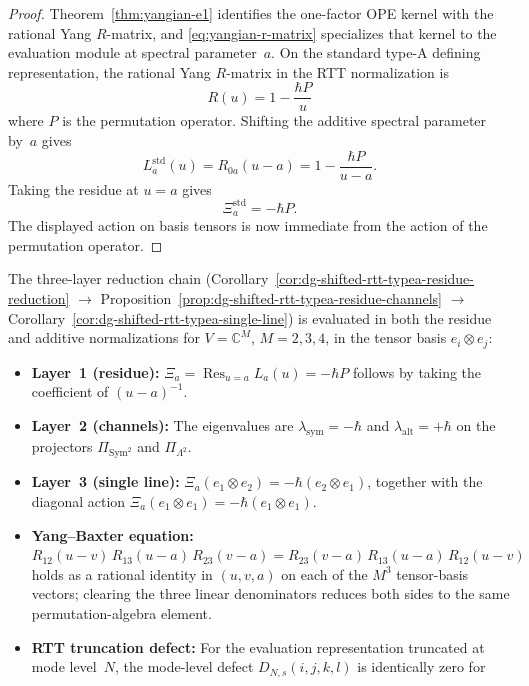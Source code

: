 \begin{proof}
Theorem~\ref{thm:yangian-e1} identifies the one-factor OPE kernel with
the rational Yang $R$-matrix, and
\eqref{eq:yangian-r-matrix} specializes that kernel to the evaluation
module at spectral parameter~$a$. On the standard type-A defining
representation, the rational Yang $R$-matrix in the RTT normalization is
\[
R(u)=1-\frac{\hbar P}{u}
\]
where $P$ is the permutation operator. Shifting the additive
spectral parameter by~$a$ gives
\[
L_a^{\mathrm{std}}(u)=R_{0a}(u-a)=1-\frac{\hbar P}{u-a}.
\]
Taking the residue at $u=a$ gives
\[
\Xi_a^{\mathrm{std}}=-\hbar P.
\]
The displayed action on basis tensors is now immediate from the action
of the permutation operator.
\end{proof}


\begin{computation}
\label{comp:mc4-three-layer-verification}
The three-layer reduction chain
(Corollary~\ref{cor:dg-shifted-rtt-typea-residue-reduction}
$\to$
Proposition~\ref{prop:dg-shifted-rtt-typea-residue-channels}
$\to$
Corollary~\ref{cor:dg-shifted-rtt-typea-single-line})
is evaluated in both the residue and additive normalizations for
$V=\mathbb C^M$, $M = 2, 3, 4$, in the tensor basis
$e_i\otimes e_j$:
\begin{itemize}
\item \textbf{Layer~1 (residue):}
 $\Xi_a = \operatorname*{Res}_{u=a}L_a(u) = -\hbar P$ follows by
 taking the coefficient of $(u-a)^{-1}$.
\item \textbf{Layer~2 (channels):}
 The eigenvalues are $\lambda_{\mathrm{sym}} = -\hbar$ and
 $\lambda_{\mathrm{alt}} = +\hbar$ on the projectors
 $\Pi_{\mathrm{Sym}^2}$ and $\Pi_{\Lambda^2}$.
\item \textbf{Layer~3 (single line):}
 $\Xi_a(e_1\otimes e_2) = -\hbar(e_2\otimes e_1)$,
 together with the diagonal action
 $\Xi_a(e_1\otimes e_1) = -\hbar(e_1\otimes e_1)$.
\item \textbf{Yang--Baxter equation:}
 $R_{12}(u{-}v)\,R_{13}(u{-}a)\,R_{23}(v{-}a)
 = R_{23}(v{-}a)\,R_{13}(u{-}a)\,R_{12}(u{-}v)$
 holds as a rational identity in $(u,v,a)$ on each of the
 $M^3$ tensor-basis vectors; clearing the three linear denominators
 reduces both sides to the same permutation-algebra element.
\item \textbf{RTT truncation defect:}
 For the evaluation representation truncated at mode level~$N$,
 the mode-level defect $D_{N,s}(i,j,k,l)$ is identically zero for

\end{itemize}
\end{computation}

